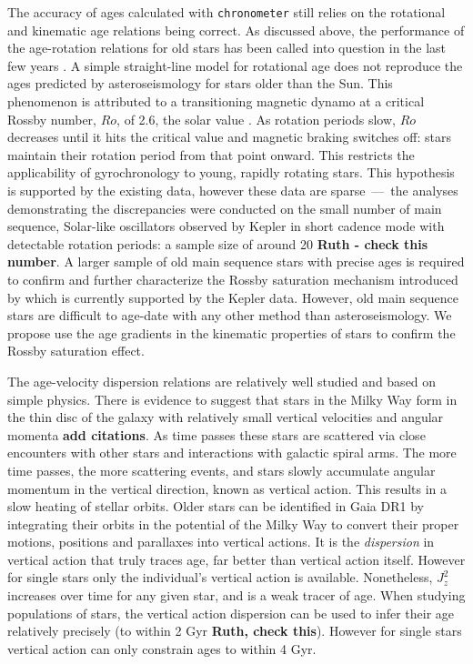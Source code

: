 \documentclass[12pt]{article}
\begin{document}
The accuracy of ages calculated with {\tt chronometer} still relies on the
rotational and kinematic age relations being correct.
As discussed above, the performance of the age-rotation relations for old
stars has been called into question in the last few years \citep{angus2015,van-saders2016, Metcalfe2016}.
A simple straight-line model for rotational age does not reproduce the ages
predicted by asteroseismology for stars older than the Sun.
This phenomenon is attributed to a transitioning magnetic dynamo at a critical
Rossby number, $Ro$, of 2.6, the solar value \citep{van-saders2016}.
As rotation periods slow, $Ro$ decreases until it hits the critical value and
magnetic braking switches off: stars maintain their rotation period from that
point onward.
This restricts the applicability of gyrochronology to young, rapidly rotating
stars.
This hypothesis is supported by the existing data, however these data are
sparse~---~the analyses demonstrating the discrepancies were conducted on the
small number of main sequence, Solar-like oscillators observed by Kepler in
short cadence mode with detectable rotation periods: a sample size of around
20 {\bf Ruth - check this number}.
A larger sample of old main sequence stars with precise ages is required to
confirm and further characterize the Rossby saturation mechanism introduced by
\citep{van-saders2016} which is currently supported by the Kepler data.
However, old main sequence stars are difficult to age-date with any other
method than asteroseismology.
We propose use the age gradients in the kinematic properties of stars to
confirm the Rossby saturation effect.

The age-velocity dispersion relations are relatively well studied and based on
simple physics.
There is evidence to suggest that stars in the Milky Way form in the thin disc
of the galaxy with relatively small vertical velocities and angular momenta
{\bf add citations}.
As time passes these stars are scattered via close encounters with other
stars and interactions with galactic spiral arms.
The more time passes, the more scattering events, and stars slowly accumulate
angular momentum in the vertical direction, known as vertical action.
This results in a slow heating of stellar orbits.
Older stars can be identified in Gaia DR1 by integrating their orbits in the
potential of the Milky Way to convert their proper motions, positions and
parallaxes into vertical actions.
It is the {\it dispersion} in vertical action that truly traces age, far
better than vertical action itself.
However for single stars only the individual's vertical action is available.
Nonetheless, $J_z^2$ increases over time for any given star, and is a weak
tracer of age.
When studying populations of stars, the vertical action dispersion can be used
to infer their age relatively precisely (to within 2 Gyr
{\bf Ruth, check this}).
However for single stars vertical action can only constrain ages to within 4
Gyr.
\end{document}
